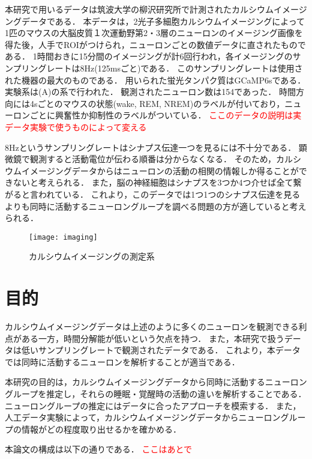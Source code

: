 本研究で用いるデータは筑波大学の柳沢研究所で計測されたカルシウムイメージングデータである．
本データは，2光子多細胞カルシウムイメージングによって1匹のマウスの大脳皮質１次運動野第2・3層のニューロンのイメージング画像を得た後，人手でROIがつけられ，ニューロンごとの数値データに直されたものである．
1時間おきに15分間のイメージングが計6回行われ，各イメージングのサンプリングレートは8Hz(125msごと)である．
このサンプリングレートは使用された機器の最大のものである．
用いられた蛍光タンパク質はGCaMP6sである．
実験系は(A)の系で行われた\cite{Kanda2016}．
観測されたニューロン数は154であった．
時間方向には4sごとのマウスの状態(wake, REM, NREM)のラベルが付いており，ニューロンごとに興奮性か抑制性のラベルがついている．
\textcolor{red}{ここのデータの説明は実データ実験で使うものによって変える}

8Hzというサンプリングレートはシナプス伝達一つを見るには不十分である．
顕微鏡で観測すると活動電位が伝わる順番は分からなくなる．
そのため，カルシウムイメージングデータからはニューロンの活動の相関の情報しか得ることができないと考えられる．
また，脳の神経細胞はシナプスを3つか4つ介せば全て繋がると言われている．
これより，このデータでは1つ1つのシナプス伝達を見るよりも同時に活動するニューロングループを調べる問題の方が適していると考えられる．
\begin{figure}[htbp]
    \begin{center}
        \texttt{[image: imaging]}
        \caption{カルシウムイメージングの測定系}
        \label{fig:imaging}
    \end{center}
\end{figure}

\section{目的}
カルシウムイメージングデータは上述のように多くのニューロンを観測できる利点がある一方，時間分解能が低いという欠点を持つ．
また，本研究で扱うデータは低いサンプリングレートで観測されたデータである．
これより，本データでは同時に活動するニューロンを解析することが適当である．

本研究の目的は，カルシウムイメージングデータから同時に活動するニューロングループを推定し，それらの睡眠・覚醒時の活動の違いを解析することである．
ニューロングループの推定にはデータに合ったアプローチを模索する．
また，人工データ実験によって，カルシウムイメージングデータからニューロングループの情報がどの程度取り出せるかを確かめる．

本論文の構成は以下の通りである．
\textcolor{red}{ここはあとで}
